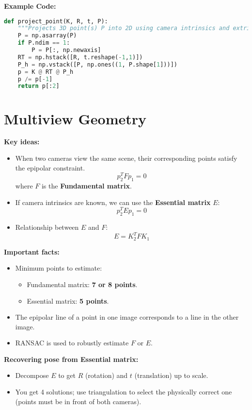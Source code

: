 \documentclass[a4paper,11pt]{article}
\begin{document}
\vspace{1em}

\textbf{Example Code:}
\begin{lstlisting}[language=Python]
def project_point(K, R, t, P):
    """Projects 3D point(s) P into 2D using camera intrinsics and extrinsics."""
    P = np.asarray(P)
    if P.ndim == 1:
        P = P[:, np.newaxis]
    RT = np.hstack([R, t.reshape(-1,1)])
    P_h = np.vstack([P, np.ones((1, P.shape[1]))])
    p = K @ RT @ P_h
    p /= p[-1]
    return p[:2]
\end{lstlisting}

\newpage
\section{Multiview Geometry}

\textbf{Key ideas:}
\begin{itemize}
    \item When two cameras view the same scene, their corresponding points satisfy the epipolar constraint.
    \[
    p_2^T F p_1 = 0
    \]
    where $F$ is the \textbf{Fundamental matrix}.
    \item If camera intrinsics are known, we can use the \textbf{Essential matrix} $E$:
    \[
    p_2^T E p_1 = 0
    \]
    \item Relationship between $E$ and $F$:
    \[
    E = K_2^T F K_1
    \]
\end{itemize}

\textbf{Important facts:}
\begin{itemize}
    \item Minimum points to estimate:
    \begin{itemize}
        \item Fundamental matrix: \textbf{7 or 8 points}.
        \item Essential matrix: \textbf{5 points}.
    \end{itemize}
    \item The epipolar line of a point in one image corresponds to a line in the other image.
    \item RANSAC is used to robustly estimate $F$ or $E$.
\end{itemize}

\textbf{Recovering pose from Essential matrix:}
\begin{itemize}
    \item Decompose $E$ to get $R$ (rotation) and $t$ (translation) up to scale.
    \item You get 4 solutions; use triangulation to select the physically correct one (points must be in front of both cameras).
\end{itemize}
\end{document}
